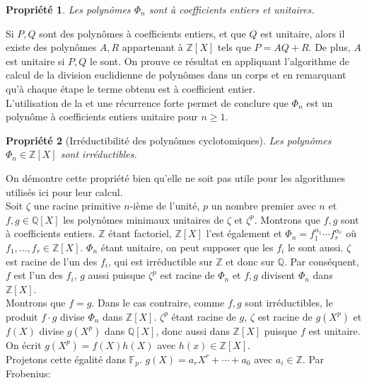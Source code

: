 \documentclass{article}
\theoremstyle{break}                  %
\newtheorem{propriete}{Propriété}
\begin{document}
\begin{propriete}
	Les polynômes $\Phi_n$ sont à coefficients entiers et unitaires.
\end{propriete}
Si $P, Q$ sont des polynômes à coefficients entiers, et que $Q$ est unitaire, alors il existe des polynômes $A,R$ appartenant à $\mathbb Z[X]$ tels que $P = AQ + R$. De plus, $A$ est unitaire si $P, Q$ le sont. On prouve ce résultat en appliquant l'algorithme de calcul de la division euclidienne de polynômes dans un corps et en remarquant qu'à chaque étape le terme obtenu est à coefficient entier.\\
L'utilisation de la  et une récurrence forte permet de conclure que $\Phi_n$ est un polynôme à coefficients entiers unitaire pour $n \ge 1$.

\begin{propriete}[Irréductibilité des polynômes cyclotomiques]
	Les polynômes $\Phi_n \in \mathbb Z[X]$ sont irréductibles.
\end{propriete}
On démontre cette propriété bien qu'elle ne soit pas utile pour les algorithmes utilisés ici pour leur calcul.\\

Soit $\zeta$ une racine primitive $n$-ième de l'unité, $p$ un nombre premier avec $n$ et $f,g \in \mathbb Q[X]$ les polynômes minimaux unitaires de $\zeta$ et $\zeta^p$. Montrons que $f,g$ sont à coefficients entiers. $\mathbb Z$ étant factoriel, $\mathbb Z[X]$ l'est également et $\Phi_n = f_1^{\alpha_1} \cdots f_r^{\alpha_r}$ où $f_1, \dots ,f_r \in \mathbb Z[X]$. $\Phi_n$ étant unitaire, on peut supposer que les $f_i$ le sont aussi. $\zeta$ est racine de l'un des $f_i$, qui est irréductible sur $\mathbb Z$ et donc sur $\mathbb Q$. Par conséquent, $f$ est l'un des $f_i$, $g$ aussi puisque $\zeta^p$ est racine de $\Phi_n$ et $f,g$ divisent $\Phi_n$ dans $\mathbb Z[X]$.\\

Montrons que $f=g$. Dans le cas contraire, comme $f,g$ sont irréductibles, le produit $f \cdot g$ divise $\Phi_n$ dans $\mathbb Z[X]$. $\zeta^p$ étant racine de $g$, $\zeta$ est racine de $g(X^p)$ et $f(X)$ divise $g(X^p)$ dans $\mathbb Q[X]$, donc aussi dans $\mathbb Z[X]$ puisque $f$ est unitaire. On écrit $g(X^p) = f(X)h(X)$ avec $h(x) \in \mathbb Z[X]$.\\

Projetons cette égalité dans $\mathbb F_p$. $g(X) = a_r X^r + \cdots + a_0$ avec $a_i \in \mathbb Z$. Par Frobenius:
\end{document}
